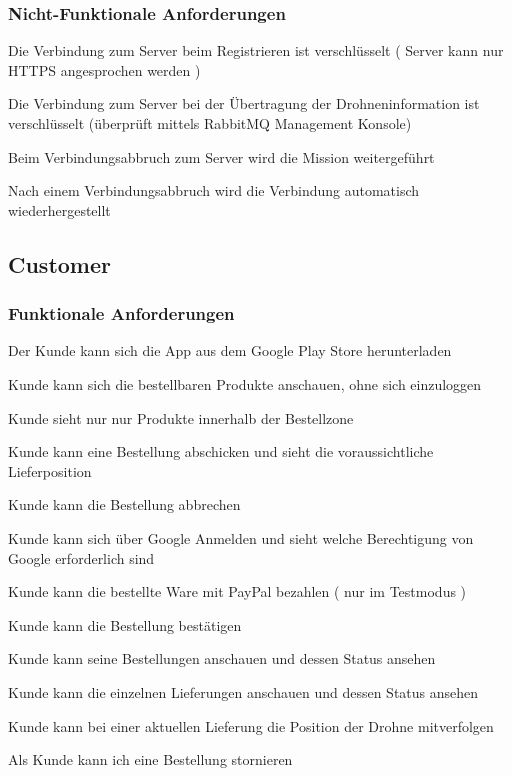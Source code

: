 \subsubsection{Nicht-Funktionale Anforderungen}
\begin{todolist}
	\item[\done] Die Verbindung zum Server beim Registrieren ist verschlüsselt ( Server kann nur HTTPS angesprochen werden )
	\item[\done] Die Verbindung zum Server bei der Übertragung der Drohneninformation ist verschlüsselt (überprüft mittels RabbitMQ Management Konsole)
	\item[\done] Beim Verbindungsabbruch zum Server wird die Mission weitergeführt
	\item[\done] Nach einem Verbindungsabbruch wird die Verbindung automatisch wiederhergestellt
\end{todolist}

\subsection{Customer}
\subsubsection{Funktionale Anforderungen}
\begin{todolist}
	\item Der Kunde kann sich die App aus dem Google Play Store herunterladen 
	\item[\done] Kunde kann sich die bestellbaren Produkte anschauen, ohne sich einzuloggen
	\item[\done] Kunde sieht nur nur Produkte innerhalb der Bestellzone
	\item[\done] Kunde kann eine Bestellung abschicken und sieht die voraussichtliche Lieferposition
	\item[\done] Kunde kann die Bestellung abbrechen
	\item[\done] Kunde kann sich über Google Anmelden und sieht welche Berechtigung von Google erforderlich sind
	\item[\done] Kunde kann die bestellte Ware mit PayPal bezahlen ( nur im Testmodus )
	\item[\done] Kunde kann die Bestellung bestätigen
	\item[\done] Kunde kann seine Bestellungen anschauen und dessen Status ansehen
	\item[\done] Kunde kann die einzelnen Lieferungen anschauen und dessen Status ansehen
	\item[\done] Kunde kann bei einer aktuellen Lieferung die Position der Drohne mitverfolgen
	\item Als Kunde kann ich  eine Bestellung stornieren 
\end{todolist}

